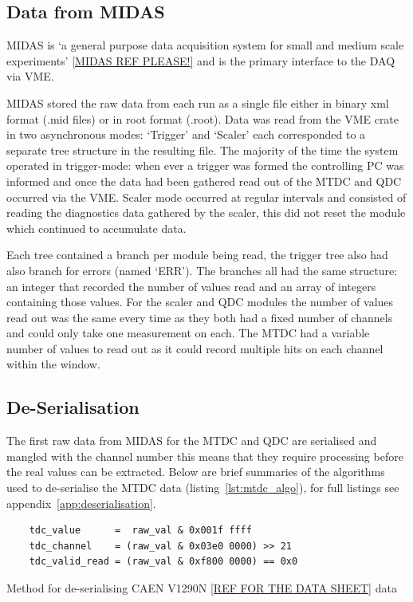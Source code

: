 \documentclass[]{article}
\begin{document}
\subsection{Data from MIDAS} %
\label{sub:data_from_midas}
MIDAS is `a general purpose data acquisition system for small and medium scale experiments' \ref{MIDAS REF PLEASE!} and is the primary interface to the DAQ via VME. 

MIDAS stored the raw data from each run as a single file either in binary xml format (.mid files) or in root format (.root). Data was read from the VME crate in two asynchronous modes: `Trigger' and `Scaler' each corresponded to a separate tree structure in the resulting file. The majority of the time the system operated in trigger-mode: when ever a trigger was formed the controlling PC was informed and once the data had been gathered read out of the MTDC and QDC occurred via the VME. Scaler mode occurred at regular intervals and consisted of reading the diagnostics data gathered by the scaler, this did not reset the module which continued to accumulate data. 

Each tree contained a branch per module being read, the trigger tree also had also branch for errors (named `ERR'). The branches all had the same structure: an integer that recorded the number of values read and an array of integers containing those values. For the scaler and QDC modules the number of values read out was the same every time as they both had a fixed number of channels and could only take one measurement on each. The MTDC had a variable number of values to read out as it could record multiple hits on each channel within the window.
\subsection{De-Serialisation} %
\label{sub:de_serialisation}
The first raw data from MIDAS for the MTDC and QDC are serialised and mangled with the channel number this means that they require processing before the real values can be extracted. Below are brief summaries of the algorithms used to de-serialise the MTDC data (listing~\ref{lst:mtdc_algo}), for full listings see appendix~\ref{app:deserialisation}.
%
\begin{listing}[htbp]
    \begin{verbatim}
    tdc_value      =  raw_val & 0x001f ffff
    tdc_channel    = (raw_val & 0x03e0 0000) >> 21
    tdc_valid_read = (raw_val & 0xf800 0000) == 0x0
    \end{verbatim}
    \caption{Method for de-serialising CAEN V1290N \ref{REF FOR THE DATA SHEET} data}
    \label{lst:mtdc_algo}
\end{listing}
\end{document}
